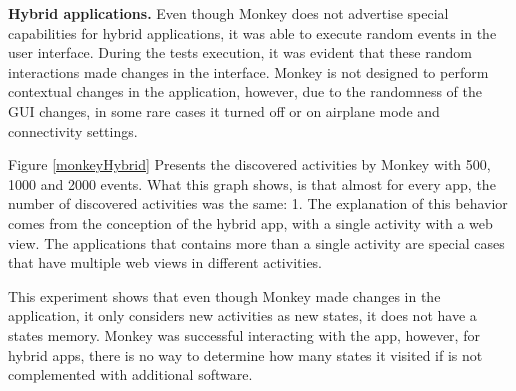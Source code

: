 

\textbf{Hybrid applications.} Even though Monkey does not advertise special capabilities for hybrid applications, it was able to execute random events in the user interface. During the tests execution, it was evident that these random interactions made changes in the interface. Monkey is not designed to perform contextual changes in the application, however, due to the randomness of the GUI changes, in some rare cases it turned off or on airplane mode and connectivity settings.

Figure \ref{monkeyHybrid} Presents the discovered activities by Monkey with 500, 1000 and 2000 events. What this graph shows, is that almost for every app, the number of discovered activities was the same: 1. The explanation of this behavior comes from the conception of the hybrid app, with a single activity with a web view. The applications that contains more than a single activity are special cases that have multiple web views in different activities.

This experiment shows that even though Monkey made changes in the application, it only considers new activities as new states, it does not have a states memory. Monkey was successful interacting with the app, however, for hybrid apps, there is no way to determine how many states it visited if is not complemented with additional software.

